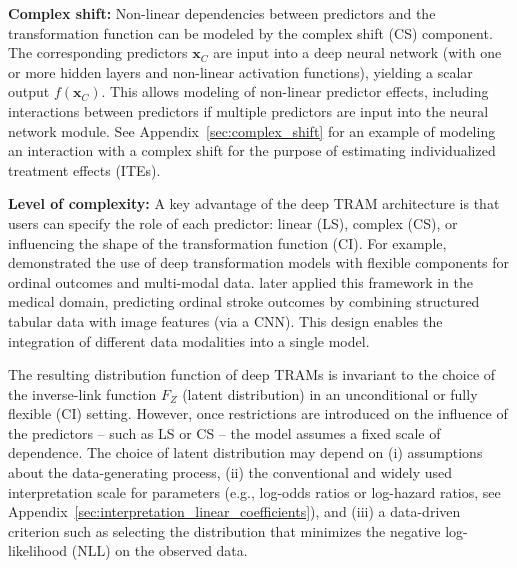 \medskip

\textbf{Complex shift:} Non-linear dependencies between predictors and the transformation function can be modeled by the complex shift (CS) component. The corresponding predictors $\mathbf{x}_{C}$ are input into a deep neural network (with one or more hidden layers and non-linear activation functions), yielding a scalar output $f(\mathbf{x}_{C})$. This allows modeling of non-linear predictor effects, including interactions between predictors if multiple predictors are input into the neural network module. See Appendix~\ref{sec:complex_shift} for an example of modeling an interaction with a complex shift for the purpose of estimating individualized treatment effects (ITEs).

\medskip


\textbf{Level of complexity:} A key advantage of the deep TRAM architecture is that users can specify the role of each predictor: linear (LS), complex (CS), or influencing the shape of the transformation function (CI). For example, \citet{kook2022} demonstrated the use of deep transformation models with flexible components for ordinal outcomes and multi-modal data. \citet{herzog2023} later applied this framework in the medical domain, predicting ordinal stroke outcomes by combining structured tabular data with image features (via a CNN). This design enables the integration of different data modalities into a single model.



\medskip

The resulting distribution function of deep TRAMs is invariant to the choice of the inverse-link function $F_Z$ (latent distribution) in an unconditional \citep{hothorn2018} or fully flexible (CI) setting. However, once restrictions are introduced on the influence of the predictors -- such as LS or CS -- the model assumes a fixed scale of dependence. The choice of latent distribution may depend on (i) assumptions about the data-generating process, (ii) the conventional and widely used interpretation scale for parameters (e.g., log-odds ratios or log-hazard ratios, see Appendix~\ref{sec:interpretation_linear_coefficients}), and (iii) a data-driven criterion such as selecting the distribution that minimizes the negative log-likelihood (NLL) on the observed data.

